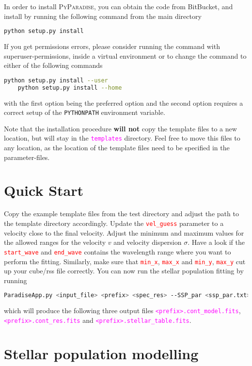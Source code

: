 \documentclass[usenatbib,usegraphicx,useAMS,onecolumn]{mn2e}
\newcommand{\codeline}[1]{\lstinline|#1|}
\newcommand{\paramdef}[1]{\textcolor{red}{\codeline{#1}}}
\newcommand{\fname}[1]{\textcolor{magenta}{\codeline{#1}}}
\begin{document}
In order to install \textsc{PyParadise}, you can obtain the code from BitBucket, and install by running the following command from the main directory
\begin{lstlisting}[language=sh]
    python setup.py install
\end{lstlisting}
If you get permissions errors, please consider running the command with superuser-permissions, inside a virtual environment or to change the command to either of the following commands
\begin{lstlisting}[language=sh]
    python setup.py install --user
    python setup.py install --home
\end{lstlisting}
with the first option being the preferred option and the second option requires a correct setup of the \codeline{PYTHONPATH} environment variable.

Note that the installation procedure \textbf{will not} copy the template files to a new location, but will stay in the \fname{templates} directory.
Feel free to move this files to any location, as the location of the template files need to be specified in the parameter-files.

\section{Quick Start}
\label{sec:quickstart}
Copy the example template files from the test directory and adjust the path to the template directory accordingly.
Update the \paramdef{vel_guess} parameter to a velocity close to the final velocity.
Adjust the minimum and maximum values for the allowed ranges for the velocity $v$ and velocity dispersion $\sigma$.
Have a look if the \paramdef{start_wave} and \paramdef{end_wave} contains the wavelength range where you want to perform the fitting.
Similarly, make sure that \paramdef{min_x}, \paramdef{max_x} and \paramdef{min_y}, \paramdef{max_y} cut up your cube/rss file correctly.
You can now run the stellar population fitting by running
\begin{lstlisting}[language=sh]
    ParadiseApp.py <input_file> <prefix> <spec_res> --SSP_par <ssp_par.txt>
\end{lstlisting}
which will produce the following three output files \fname{<prefix>.cont_model.fits}, \fname{<prefix>.cont_res.fits} and \fname{<prefix>.stellar_table.fits}.

\section{Stellar population modelling}
\label{sec:ssp_model}
\end{document}
